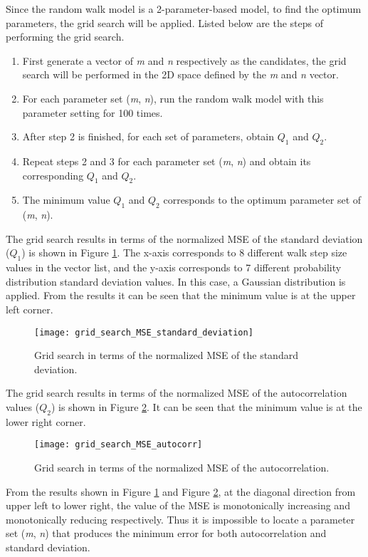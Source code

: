 \documentclass{umthesis}
\begin{document}
Since the random walk model is a 2-parameter-based model, to find the optimum parameters, the grid search will be applied. Listed below are the steps of performing the grid search. 

\begin{enumerate}
  \item First generate a vector of \textit{m} and \textit{n} respectively as the candidates, the grid search will be performed in the 2D space defined by the \textit{m} and \textit{n} vector.
  \item For each parameter set (\textit{m}, \textit{n}), run the random walk model with this parameter setting for 100 times.
  \item After step 2 is finished, for each set of parameters, obtain $Q_1$ and $Q_2$.
  \item Repeat steps 2 and 3 for each parameter set (\textit{m}, \textit{n}) and obtain its corresponding $Q_1$ and $Q_2$.
  \item The minimum value $Q_1$ and $Q_2$ corresponds to the optimum parameter set of (\textit{m}, \textit{n}).
\end{enumerate}

The grid search results in terms of the normalized MSE of the standard deviation ($Q_1$) is shown in Figure \ref{fig:gridSeachSD}. The x-axis corresponds to 8 different walk step size values in the vector list, and the y-axis corresponds to 7 different probability distribution standard deviation values. In this case, a Gaussian distribution is applied. From the results it can be seen that the minimum value is at the upper left corner.

\begin{figure}
  \centering
  \texttt{[image: grid\_search\_MSE\_standard\_deviation]}
  \caption{Grid search in terms of the normalized MSE of the standard deviation.}\label{fig:gridSeachSD}
\end{figure}

The grid search results in terms of the normalized MSE of the autocorrelation values ($Q_2$) is shown in Figure \ref{fig:gridSeachAC}. It can be seen that the minimum value is at the lower right corner. 

\begin{figure}
  \centering
  \texttt{[image: grid\_search\_MSE\_autocorr]}
  \caption{Grid search in terms of the normalized MSE of the autocorrelation.}\label{fig:gridSeachAC}
\end{figure}

From the results shown in Figure \ref{fig:gridSeachSD} and Figure \ref{fig:gridSeachAC}, at the diagonal direction from upper left to lower right, the value of the MSE is monotonically increasing and monotonically reducing respectively. Thus it is impossible to locate a parameter set (\textit{m}, \textit{n}) that produces the minimum error for both autocorrelation and standard deviation.
\end{document}
